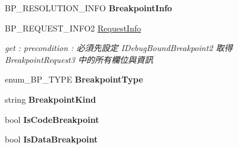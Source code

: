\begin{DoxyCompactItemize}
\item 
\hypertarget{classlib_wather_debugger_1_1_breakpoint_1_1_debug_breakpoint_a96140b6cd744f00b5503679c77a4d78e}{B\+P\+\_\+\+R\+E\+S\+O\+L\+U\+T\+I\+O\+N\+\_\+\+I\+N\+F\+O {\bfseries Breakpoint\+Info}}\label{classlib_wather_debugger_1_1_breakpoint_1_1_debug_breakpoint_a96140b6cd744f00b5503679c77a4d78e}

\item 
B\+P\+\_\+\+R\+E\+Q\+U\+E\+S\+T\+\_\+\+I\+N\+F\+O2 \hyperlink{classlib_wather_debugger_1_1_breakpoint_1_1_debug_breakpoint_a6cfd191f546cfd50d85a61ab33ef899a}{Request\+Info}
\begin{DoxyCompactList}\small\item\em get \+: precondition \+: 必須先設定 I\+Debug\+Bound\+Breakpoint2 取得 Breakpoint\+Request3 中的所有欄位與資訊 \end{DoxyCompactList}\item 
\hypertarget{classlib_wather_debugger_1_1_breakpoint_1_1_debug_breakpoint_a2ce295dacdb65cf3528ced256dee1963}{enum\+\_\+\+B\+P\+\_\+\+T\+Y\+P\+E {\bfseries Breakpoint\+Type}}\label{classlib_wather_debugger_1_1_breakpoint_1_1_debug_breakpoint_a2ce295dacdb65cf3528ced256dee1963}

\item 
\hypertarget{classlib_wather_debugger_1_1_breakpoint_1_1_debug_breakpoint_a25fafd62a1c332f02361e077527ef511}{string {\bfseries Breakpoint\+Kind}}\label{classlib_wather_debugger_1_1_breakpoint_1_1_debug_breakpoint_a25fafd62a1c332f02361e077527ef511}

\item 
\hypertarget{classlib_wather_debugger_1_1_breakpoint_1_1_debug_breakpoint_a1e675420db20d96e2f152abc5303077f}{bool {\bfseries Is\+Code\+Breakpoint}}\label{classlib_wather_debugger_1_1_breakpoint_1_1_debug_breakpoint_a1e675420db20d96e2f152abc5303077f}

\item 
\hypertarget{classlib_wather_debugger_1_1_breakpoint_1_1_debug_breakpoint_acd08337c1b10279e28a72ab05f948467}{bool {\bfseries Is\+Data\+Breakpoint}}\label{classlib_wather_debugger_1_1_breakpoint_1_1_debug_breakpoint_acd08337c1b10279e28a72ab05f948467}


\end{DoxyCompactItemize}
